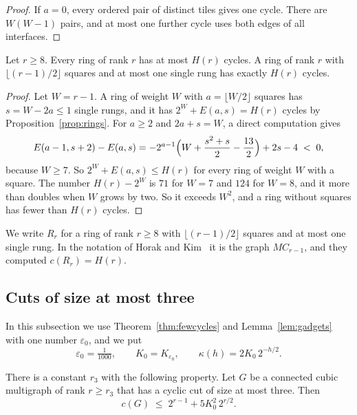 \begin{proof}
If $a=0$, every ordered pair of distinct tiles gives one cycle. There are $W(W-1)$ pairs, and at
most one further cycle uses both edges of all interfaces.
\end{proof}

\begin{corollary}\label{cor:ringmax}
Let $r\ge8$. Every ring of rank $r$ has at most $H(r)$ cycles. A ring of rank $r$ with
$\lfloor(r-1)/2\rfloor$ squares and at most one single rung has exactly $H(r)$ cycles.
\end{corollary}

\begin{proof}
Let $W=r-1$. A ring of weight $W$ with $a=\lfloor W/2\rfloor$ squares has $s=W-2a\le1$ single
rungs, and it has $2^{W}+E(a,s)=H(r)$ cycles by Proposition~\ref{prop:rings}. For $a\ge2$ and
$2a+s=W$, a direct computation gives
\[
  E(a-1,s+2)-E(a,s)=-2^{a-1}\Bigl(W+\frac{s^{2}+s}2-\frac{13}2\Bigr)+2s-4\;<\;0,
\]
because $W\ge7$. So $2^{W}+E(a,s)\le H(r)$ for every ring of weight $W$ with a square. The number
$H(r)-2^{W}$ is $71$ for $W=7$ and $124$ for $W=8$, and it more than doubles when $W$ grows by
two. So it exceeds $W^{2}$, and a ring without squares has fewer than $H(r)$ cycles.
\end{proof}

We write $R_r$ for a ring of rank $r\ge8$ with $\lfloor(r-1)/2\rfloor$ squares and at most one
single rung. In the notation of Horak and Kim~\cite{HK} it is the graph $MC_{r-1}$, and they
computed $c(R_r)=H(r)$.

\subsection{Cuts of size at most three}\label{sec:threecut}

In this subsection we use Theorem~\ref{thm:fewcycles} and Lemma~\ref{lem:gadgets} with one
number $\varepsilon_0$, and we put
\[
  \varepsilon_0=\tfrac1{1000},\qquad K_0=K_{\varepsilon_0},\qquad\kappa(h)=2K_0\,2^{-h/2}.
\]

\begin{proposition}\label{prop:threecut}
There is a constant $r_3$ with the following property. Let $G$ be a connected cubic multigraph
of rank $r\ge r_3$ that has a cyclic cut of size at most three. Then
\[
  c(G)\;\le\;2^{r-1}+5K_0^{2}\,2^{r/2}.
\]
\end{proposition}

